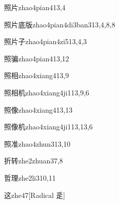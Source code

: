 \begin{entry}{照片}{zhao4pian4}{13,4}
\end{entry}

\begin{entry}{照片底版}{zhao4pian4di3ban3}{13,4,8,8}
\end{entry}

\begin{entry}{照片子}{zhao4pian4zi5}{13,4,3}
\end{entry}

\begin{entry}{照骗}{zhao4pian4}{13,12}
\end{entry}

\begin{entry}{照相}{zhao4xiang4}{13,9}
\end{entry}

\begin{entry}{照相机}{zhao4xiang4ji1}{13,9,6}
\end{entry}

\begin{entry}{照像}{zhao4xiang4}{13,13}
\end{entry}

\begin{entry}{照像机}{zhao4xiang4ji1}{13,13,6}
\end{entry}

\begin{entry}{照准}{zhao4zhun3}{13,10}
\end{entry}

\begin{entry}{折转}{zhe2zhuan3}{7,8}
\end{entry}

\begin{entry}{哲理}{zhe2li3}{10,11}
\end{entry}

\begin{entry}{这}{zhe4}{7}[Radical 辵]
\end{entry}

